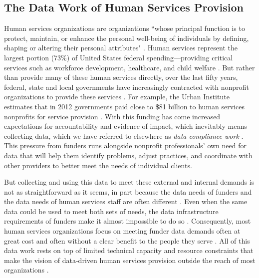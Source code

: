 \subsection{The Data Work of Human Services Provision}

Human services organizations are organizations ``whose principal function is to protect, maintain, or enhance the personal well-being of individuals by defining, shaping or altering their personal attributes" \citep{Hasenfeld1974Human}. Human services represent the largest portion (73\%) of United States federal spending---providing critical services such as workforce development, healthcare, and child welfare \citep{Desilver2017Fed}. But rather than provide many of these human services directly, over the last fifty years, federal, state and local governments have increasingly contracted with nonprofit organizations to provide these services \citep{Smith1993Contracting}.  For example, the Urban Institute estimates that in 2012 governments paid close to \$81 billion to human services nonprofits for service provision \citep{Pettijohn2013Urban}. With this funding has come increased expectations for accountability and evidence of impact, which inevitably means collecting data, which we have referred to elsewhere as \textit{data compliance work} \citep{Benjamin2018Policy}. This pressure from funders runs alongside nonprofit professionals' own need for data that will help them identify problems, adjust practices, and coordinate with other providers to better meet the needs of individual clients. 

But collecting and using this data to meet these external and internal demands is not as straightforward as it seems, in part because the data needs of funders and the data needs of human services staff are often different \citep{Benjamin2008Risk,Benjamin2012FrontOut,Ebrahim2003NGOs,LeDantec2008Trenches}. Even when the same data could be used to meet both sets of needs, the data infrastructure requirements of funders make it almost impossible to do so \citep{Benjamin2018Policy,Bopp2017DbD,LeDantec2008Trenches,Ebrahim2003NGOs}.  Consequently, most human services organizations focus on meeting funder data demands often at great cost and often without a clear benefit to the people they serve \citep{Benjamin2008Risk,Carman2007Evaluation,Ebrahim2003NGOs,Snibbe2006Drown}. All of this data work rests on top of limited technical capacity and resource constraints that make the vision of data-driven human services provision outside the reach of most organizations \citep{Benjamin2018Policy,Bopp2017DbD,Burt2000ICTs,Burt2003NewTech,LeDantec2008Trenches,McPhail1998Caveat,Merkel2007NPOMethods,Merkel2004PD,Voida2011Shapeshifters,Voida2011Homebrew,Voida2012VolCoord}.

